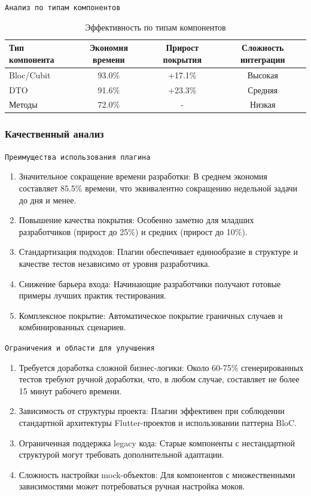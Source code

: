 \documentclass[14pt, russian]{scrartcl}
\begin{document}
\texttt{Анализ по типам компонентов}

\begin{table}[h!]
\centering
\begin{tabular}{|l|c|c|c|}
\hline
Тип компонента & Экономия времени & Прирост покрытия & Сложность интеграции \\
\hline
Bloc/Cubit & 93.0\% & +17.1\% & Высокая \\
DTO & 91.6\% & +23.3\% & Средняя \\
Методы & 72.0\% & - & Низкая \\
\hline
\end{tabular}
\vspace{1ex}
\caption{Эффективность по типам компонентов}
\end{table}

\subsubsection{Качественный анализ}

\texttt{Преимущества использования плагина}

\begin{enumerate}
    \item Значительное сокращение времени разработки: В среднем экономия составляет 85.5\% времени, что эквивалентно сокращению недельной задачи до дня и менее.
    \item Повышение качества покрытия: Особенно заметно для младших разработчиков (прирост до 25\%) и средних (прирост до 10\%).
    \item Стандартизация подходов: Плагин обеспечивает единообразие в структуре и качестве тестов независимо от уровня разработчика.
    \item Снижение барьера входа: Начинающие разработчики получают готовые примеры лучших практик тестирования.
    \item Комплексное покрытие: Автоматическое покрытие граничных случаев и комбинированных сценариев.
\end{enumerate}

\texttt{Ограничения и области для улучшения}

\begin{enumerate}
    \item Требуется доработка сложной бизнес-логики: Около 60-75\% сгенерированных тестов требуют ручной доработки, что, в любом случае, составляет не более 15 минут рабочего времени.
    \item Зависимость от структуры проекта: Плагин эффективен при соблюдении стандартной архитектуры Flutter-проектов и использовании паттерна BloC.
    \item Ограниченная поддержка legacy кода: Старые компоненты с нестандартной структурой могут требовать дополнительной адаптации.
    \item Сложность настройки mock-объектов: Для компонентов с множественными зависимостями может потребоваться ручная настройка моков.
\end{enumerate}
\end{document}
